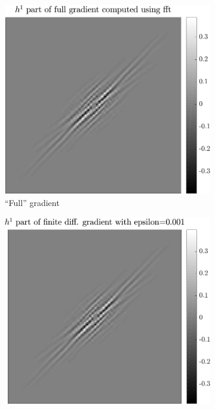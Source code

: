 \begin{figure}[!ht]\centering
\begin{subfigure}[b]{0.30\textwidth}\centering
\includegraphics[width=\textwidth]{figures/verif_gradient/gradient.pdf}
\caption{“Full” gradient}
\end{subfigure}
\begin{subfigure}[b]{0.30\textwidth}\centering
\includegraphics[width=\textwidth]{figures/verif_gradient/finite-diff.pdf}

\end{subfigure}
\end{figure}
